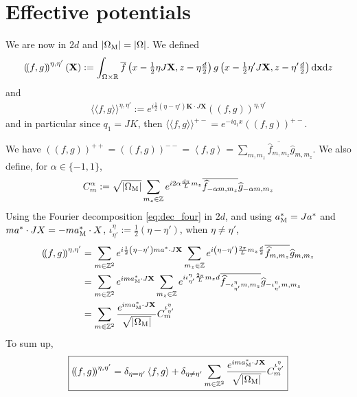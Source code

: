 \documentclass[11pt,a4paper,reqno,french,tikz]{amsart}
\def\d{{\rm d}}
\newcommand{\pa}[1]{\left( #1 \right)} %
\newcommand{\ab}[1]{\left|#1\right|} %
\newcommand{\ps}[1]{\left< #1 \right>} %
\newcommand{\f}[2]{\frac{#1}{#2}} %
\newcommand{\ind}[1]{_{\textup{#1}}} %
\newcommand{\db}[1]{\left(\!\left( #1 \right)\!\right)}
\def\bX{{\mathbf X}}
\def\bx{{\mathbf x}}
\def\bK{{\mathbf K}}
\newcommand{\dd}{\tfrac{d}{2}}
\newcommand{\sqom}{\sqrt{\ab{\Omega\ind{M}}}}
\def\lAngle{\langle\!\langle}
\def\rAngle{\rangle\!\rangle}
\begin{document}
\section{Effective potentials}%
\label{sec:effective_potentials}

We are now in $2d$ and $\ab{\Omega\ind{M}} = \ab{\Omega}$. 
We defined
\begin{align*}
\db{ f, g}^{\eta,\eta'}(\bX) :=   \int_{\Omega \times \R} \overline{f}\pa{x - \tfrac 12 \eta J\bX,z- \eta\dd} g\pa{x - \tfrac 12 \eta' J \bX, z- \eta'\dd} \d \bx \d z
\end{align*}
and
\begin{align*}
\boxed{\lAngle f, g \rAngle^{\eta,\eta'} := e^{i\f 12 \pa{\eta-\eta'} \bK \cdot J \bX}\db{ f, g}^{\eta,\eta'}}
\end{align*}
and in particular since $q_1 = J K$, then $\lAngle f, g \rAngle^{+-} = e^{-iq_1 x}\db{ f, g}^{+-}$. 



We have $\db{f,g}^{++} = \db{f,g}^{--} = \ps{f,g} = \sum_{m,m_z} \overline{\widehat{f}_{m,m_z}} \widehat{g}_{m,m_z}$. We also define, for $\alpha \in \{-1,1\}$,
\begin{align*}
C^\alpha_m := \sqom\sum_{m_z \in \Z} e^{ i2\alpha \f{d\pi}{L} m_z} \overline{\widehat{f}_{-\alpha m,m_z}} \widehat{g}_{-\alpha m,m_z}
\end{align*}
Using the Fourier decomposition \eqref{eq:dec_four} in $2d$, and using $a^*\ind{M} = J a^*$ and $ma^* \cdot JX = -m a\ind{M}^* \cdot X$, $\iota^\eta_{\eta'} := \f 12 \pa{\eta - \eta'}$, when $\eta \neq \eta'$,
\begin{align*}
	\db{f,g}^{\eta,\eta'} &=   \sum_{m \in \Z^2} e^{i\f 12 \pa{\eta-\eta'} ma^* \cdot J \bX} \sum_{m_z \in \Z} e^{i\pa{\eta-\eta'} \f{2\pi}{L} m_z \f{d}{2}} \overline{\widehat{f}_{m,m_z}} \widehat{g}_{m,m_z}\\
			      &=   \sum_{m \in \Z^2} e^{i ma^*\ind{M} \cdot J \bX} \sum_{m_z \in \Z} e^{i \iota^\eta_{\eta'} \f{2\pi}{L} m_z d} \overline{\widehat{f}_{-\iota^\eta_{\eta'} m,m_z}} \widehat{g}_{-\iota^\eta_{\eta'} m,m_z}\\
			      & = \sum_{m \in \Z^2} \f{e^{i ma^*\ind{M} \cdot J \bX}}{\sqom} C_{m}^{\iota^\eta_{\eta'}}
\end{align*}
To sum up,
\begin{align*}
	\boxed{\db{f,g}^{\eta,\eta'} = \delta_{\eta = \eta'} \ps{f,g} + \delta_{\eta \neq \eta'}\sum_{m \in \Z^2} \f{e^{i ma^*\ind{M} \cdot J \bX}}{\sqom} C_{m}^{\iota^\eta_{\eta'}}}
\end{align*}
\end{document}
